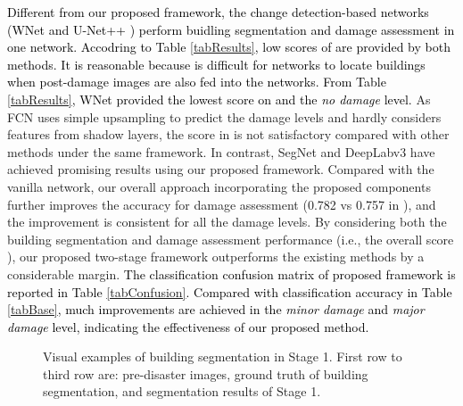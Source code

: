 \documentclass[journal]{IEEEtran}
\begin{document}
\textcolor{black}{Different from our proposed framework, the change detection-based networks (WNet \cite{houWNetCDGANBitemporal2020} and U-Net++ \cite{pengEndtoEndChangeDetection2019}) perform buidling segmentation and damage assessment in one network. Accodring to Table \ref{tabResults}, low scores of  are provided by both methods. It is reasonable because is difficult for networks to locate buildings when post-damage images are also fed into the networks. From Table \ref{tabResults}, WNet provided the lowest score on  and the \textit{no damage} level.}
As FCN uses simple upsampling to predict the damage levels and hardly considers features from shadow layers, the score in  is not satisfactory compared with other methods under the same framework. In contrast, SegNet and DeepLabv3 have achieved promising results using our proposed framework. Compared with the vanilla network, our overall approach incorporating the proposed components further improves the accuracy for damage assessment (0.782 vs 0.757 in ), and the improvement is consistent for all the damage levels. By considering both the building segmentation and damage assessment performance (i.e., the overall score ), our proposed two-stage framework outperforms the existing methods \cite{gupta2020rescuenet,weber2020building} by a considerable margin. 
\textcolor{black}{The classification confusion matrix of proposed framework is reported in Table \ref{tabConfusion}. Compared with classification accuracy in Table \ref{tabBase}, much improvements are achieved in the \textit{minor damage} and \textit{major damage} level, indicating the effectiveness of our proposed method. }


\begin{figure}[t]
	\centering
	 \hspace{-3mm}
	\caption{Visual examples of building segmentation in Stage 1. First row to third row are: pre-disaster images, ground truth of building segmentation, and segmentation results of Stage 1. }
	\label{figBuildingloc}
\end{figure}
\end{document}
